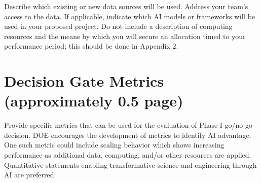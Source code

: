 \documentclass[pgs]{DOE}
\begin{document}
Describe which existing or new data sources will be used. Address your team’s access to the data. If applicable, indicate which AI models or frameworks will be used in your proposed project. Do not include a description of computing resources and the means by which you will secure an allocation timed to your performance period; this should be done in Appendix 2.  

\vspace{18pt}
\section{Decision Gate Metrics (approximately 0.5 page)}

Provide specific metrics that can be used for the evaluation of Phase I go/no go decision. DOE encourages the development of metrics to identify AI advantage. One such metric could include scaling behavior which shows increasing performance as additional data, computing, and/or other resources are applied. Quantitative statements enabling transformative science and engineering through AI are preferred.
\end{document}
